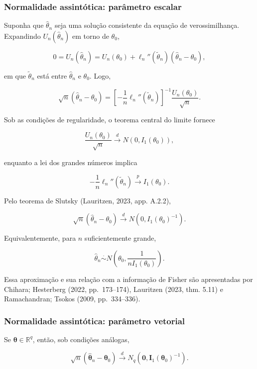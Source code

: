\documentclass[
  letterpaper,
  DIV=11,
  numbers=noendperiod]{scrreprt}
\begin{document}
\subsubsection{Normalidade assintótica: parâmetro
escalar}\label{normalidade-assintuxf3tica-paruxe2metro-escalar}

Suponha que \(\widehat\theta_n\) seja uma solução consistente da equação
de verossimilhança. Expandindo \(U_n(\widehat\theta_n)\) em torno de
\(\theta_0\),

\[0
=
U_n(\widehat\theta_n)
=
U_n(\theta_0)
+
\ell_n''(\widetilde\theta_n)
(\widehat\theta_n-\theta_0),\]

em que \(\widetilde\theta_n\) está entre \(\widehat\theta_n\) e
\(\theta_0\). Logo,

\[\sqrt n
(\widehat\theta_n-\theta_0)
=
\left[
-\frac{1}{n}
\ell_n''(\widetilde\theta_n)
\right]^{-1}
\frac{U_n(\theta_0)}{\sqrt n}.\]

Sob as condições de regularidade, o teorema central do limite fornece

\[\frac{U_n(\theta_0)}{\sqrt n}
\xrightarrow{d}
N
\left(
0,I_1(\theta_0)
\right),\]

enquanto a lei dos grandes números implica

\[-\frac{1}{n}
\ell_n''(\widetilde\theta_n)
\xrightarrow{p}
I_1(\theta_0).\]

Pelo teorema de Slutsky (Lauritzen, 2023, app. A.2.2),

\[\sqrt n
(\widehat\theta_n-\theta_0)
\xrightarrow{d}
N
\left(
0,
I_1(\theta_0)^{-1}
\right).\]

Equivalentemente, para \(n\) suficientemente grande,

\[\widehat\theta_n
\overset{\cdot}{\sim}
N
\left(
\theta_0,
\frac{1}{nI_1(\theta_0)}
\right).\]

Essa aproximação e sua relação com a informação de Fisher são
apresentadas por Chihara; Hesterberg (2022, pp.~173--174), Lauritzen
(2023, thm. 5.11) e Ramachandran; Tsokos (2009, pp.~334--336).

\subsubsection{Normalidade assintótica: parâmetro
vetorial}\label{normalidade-assintuxf3tica-paruxe2metro-vetorial}

Se \(\boldsymbol\theta\in\mathbb{R}^q\), então, sob condições análogas,

\[\sqrt n
\left(
\widehat{\boldsymbol\theta}_n
-
\boldsymbol\theta_0
\right)
\xrightarrow{d}
N_q
\left(
\mathbf{0},
\mathbf{I}_1(\boldsymbol\theta_0)^{-1}
\right).\]
\end{document}

